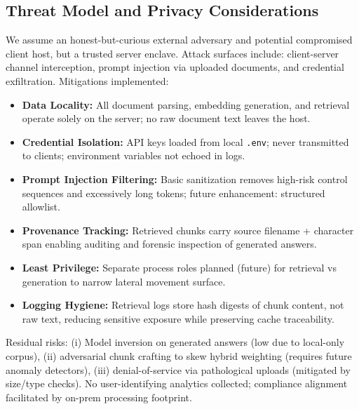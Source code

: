 \documentclass[11pt]{article}
\begin{document}
\subsection{Threat Model and Privacy Considerations}
We assume an honest-but-curious external adversary and potential compromised client host, but a trusted server enclave. Attack surfaces include: client-server channel interception, prompt injection via uploaded documents, and credential exfiltration. Mitigations implemented:
\begin{itemize}
  \item \textbf{Data Locality:} All document parsing, embedding generation, and retrieval operate solely on the server; no raw document text leaves the host.
  \item \textbf{Credential Isolation:} API keys loaded from local \texttt{.env}; never transmitted to clients; environment variables not echoed in logs.
  \item \textbf{Prompt Injection Filtering:} Basic sanitization removes high-risk control sequences and excessively long tokens; future enhancement: structured allowlist.
  \item \textbf{Provenance Tracking:} Retrieved chunks carry source filename + character span enabling auditing and forensic inspection of generated answers.
  \item \textbf{Least Privilege:} Separate process roles planned (future) for retrieval vs generation to narrow lateral movement surface.
  \item \textbf{Logging Hygiene:} Retrieval logs store hash digests of chunk content, not raw text, reducing sensitive exposure while preserving cache traceability.
\end{itemize}
Residual risks: (i) Model inversion on generated answers (low due to local-only corpus), (ii) adversarial chunk crafting to skew hybrid weighting (requires future anomaly detectors), (iii) denial-of-service via pathological uploads (mitigated by size/type checks). No user-identifying analytics collected; compliance alignment facilitated by on-prem processing footprint.
\end{document}
